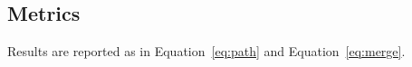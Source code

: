 \subsection{Metrics}
Results are reported as in Equation~\eqref{eq:path} and Equation~\eqref{eq:merge}.
